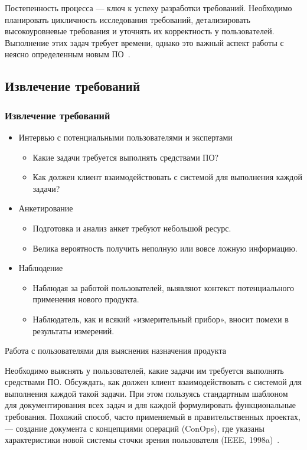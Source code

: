 \documentclass{../industrial-development}
\begin{document}
Постепенность процесса — ключ к успеху разработки требований. Необходимо планировать цикличность исследования требований, детализировать высокоуровневые требования и уточнять их корректность у пользователей. Выполнение этих задач требует времени, однако это важный аспект работы с неясно определенным новым ПО~\cite[с.~12-13]{Wiegers}.


\subsection{Извлечение требований}
\begin{frame} \frametitle{Извлечение требований}
\begin{itemize}

\item \alert{Интервью с потенциальными пользователями и экспертами}
\begin{itemize} 
\item Какие задачи требуется выполнять средствами ПО? 
\item Как должен клиент взаимодействовать с
системой для выполнения каждой задачи? 
\end{itemize}

\item \alert{Анкетирование}
\begin{itemize} 
\item Подготовка и анализ анкет требуют небольшой ресурс.
\item Велика вероятность получить неполную или вовсе ложную информацию. 
\end{itemize}

\item \alert{Наблюдение}
\begin{itemize} 
\item Наблюдая за работой пользователей, выявляют контекст потенциального применения нового продукта.
\item Наблюдатель, как и всякий «измерительный прибор», вносит помехи в результаты измерений.
\end{itemize} 

\end{itemize}
\end{frame}

\lecturenotes

\alert{Работа с пользователями для выяснения назначения продукта}

Необходимо выяснять у пользователей, какие задачи им требуется выполнять средствами ПО. Обсуждать, как должен клиент взаимодействовать с системой для выполнения каждой такой задачи. При этом пользуясь стандартным шаблоном для документирования всех задач и для каждой формулировать функциональные требования. Похожий способ, часто применяемый в правительственных проектах, — создание документа с концепциями операций (ConOps), где указаны характеристики новой системы сточки зрения пользователя (IEEE, 1998a)~\cite[с.~46]{Wiegers}.
\end{document}
